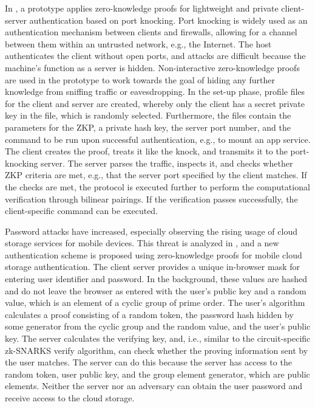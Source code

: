 In \citet{Major}, a prototype applies zero-knowledge proofs for lightweight and private client-server authentication based on port knocking. Port knocking is widely used as an authentication mechanism between clients and firewalls, allowing for a channel between them within an untrusted network, e.g., the Internet. The host authenticates the client without open ports, and attacks are difficult because the machine's function as a server is hidden. Non-interactive zero-knowledge proofs are used in the prototype to work towards the goal of hiding any further knowledge from sniffing traffic or eavesdropping. In the set-up phase, profile files for the client and server are created, whereby only the client has a secret private key in the file, which is randomly selected.
Furthermore, the files contain the parameters for the ZKP, a private hash key, the server port number, and the command to be run upon successful authentication, e.g., to mount an app service. The client creates the proof, treats it like the knock, and transmits it to the port-knocking server. The server parses the traffic, inspects it, and checks whether ZKP criteria are met, e.g., that the server port specified by the client matches. If the checks are met, the protocol is executed further to perform the computational verification through bilinear pairings. If the verification passes successfully, the client-specific command can be executed.

Password attacks have increased, especially observing the rising usage of cloud storage services for mobile devices. This threat is analyzed in \citet{Munivel}, and a new authentication scheme is proposed using zero-knowledge proofs for mobile cloud storage authentication. The client server provides a unique in-browser mask for entering user identifier and password. In the background, these values are hashed and do not leave the browser as entered with the user's public key and a random value, which is an element of a cyclic group of prime order. The user's algorithm calculates a proof consisting of a random token, the password hash hidden by some generator from the cyclic group and the random value, and the user's public key. The server calculates the verifying key, and, i.e., similar to the circuit-specific zk-SNARKS verify algorithm, can check whether the proving information sent by the user matches. The server can do this because the server has access to the random token, user public key, and the group element generator, which are public elements. Neither the server nor an adversary can obtain the user password and receive access to the cloud storage.

